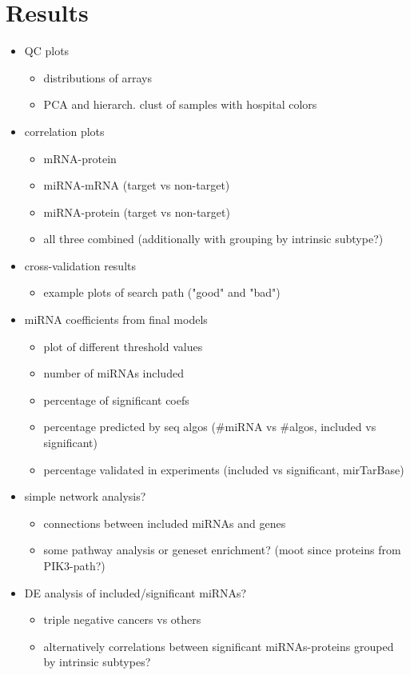 
\section{Results}

\begin{itemize}
  \item QC plots
  \begin{itemize}
    \item distributions of arrays
    \item PCA and hierarch. clust of samples with hospital colors
  \end{itemize}
  \item correlation plots
  \begin{itemize}
    \item mRNA-protein
    \item miRNA-mRNA (target vs non-target)
    \item miRNA-protein (target vs non-target)
    \item all three combined (additionally with grouping by intrinsic subtype?)
  \end{itemize}
  \item cross-validation results
  \begin{itemize}
    \item example plots of search path ("good" and "bad")
  \end{itemize}
  \item miRNA coefficients from final models
  \begin{itemize}
  	\item plot of different threshold values
    \item number of miRNAs included
    \item percentage of significant coefs
    \item percentage predicted by seq algos (#miRNA vs #algos, included vs significant)
    \item percentage validated in experiments (included vs significant, mirTarBase)
  \end{itemize}
  \item simple network analysis?
  \begin{itemize}
    \item connections between included miRNAs and genes
    \item some pathway analysis or geneset enrichment? (moot since proteins from PIK3-path?)
  \end{itemize}
  \item DE analysis of included/significant miRNAs?
  \begin{itemize}
    \item triple negative cancers vs others
    \item alternatively correlations between significant miRNAs-proteins grouped by intrinsic subtypes?
  \end{itemize}

\end{itemize}

\begin{center}
  
\end{center}
